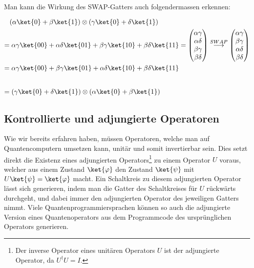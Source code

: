 \paragraph{}
\noindent Man kann die Wirkung des SWAP-Gatters auch folgendermassen erkennen:

\vspace{-0.3cm}
\[\begin{split}
&(\alpha \ket{0}+\beta\ket{1})\otimes(\gamma\ket{0}+\delta\ket{1}) \\
= &\;\alpha\gamma\ket{00} +\alpha\delta\ket{01}+\beta\gamma\ket{10}+\beta\delta\ket{11} = \begin{pmatrix} \alpha\gamma \\ \alpha\delta \\ \beta\gamma \\ \beta\delta \end{pmatrix} \overset{SWAP}{\longrightarrow }  \begin{pmatrix} \alpha\gamma \\ \beta\gamma  \\ \alpha\delta \\ \beta\delta \end{pmatrix}  \\
= &\;\alpha\gamma\ket{00} +\beta\gamma\ket{01}+\alpha\delta\ket{10}+\beta\delta\ket{11}   \\[0.7cm]
= & \; (\gamma\ket{0}+\delta\ket{1})\otimes(\alpha \ket{0}+\beta\ket{1}) \\
\end{split}\]

\subsection{Kontrollierte und adjungierte Operatoren}
Wie wir bereits erfahren haben, müssen Operatoren, welche man auf Quantencomputern umsetzen kann, unitär und somit invertierbar sein. Dies setzt direkt die Existenz eines adjungierten Operators\footnote{Der inverse Operator eines unitären Operators $U$ ist der adjungierte Operator, da $U^\dagger U = I$.} zu einem Operator $U$ voraus, welcher aus einem Zustand $\ket{\varphi}$ den Zustand $\ket{\psi}$ mit $U\ket{\psi} = \ket{\varphi}$ macht. Ein Schaltkreis zu diesem adjungierten Operator lässt sich generieren, indem man die Gatter des Schaltkreises für $U$ rückwärts durchgeht, und dabei immer den adjungierten Operator des jeweiligen Gatters nimmt. Viele Quantenprogrammiersprachen können so auch die adjungierte Version eines Quantenoperators aus dem Programmcode des ursprünglichen Operators generieren.

